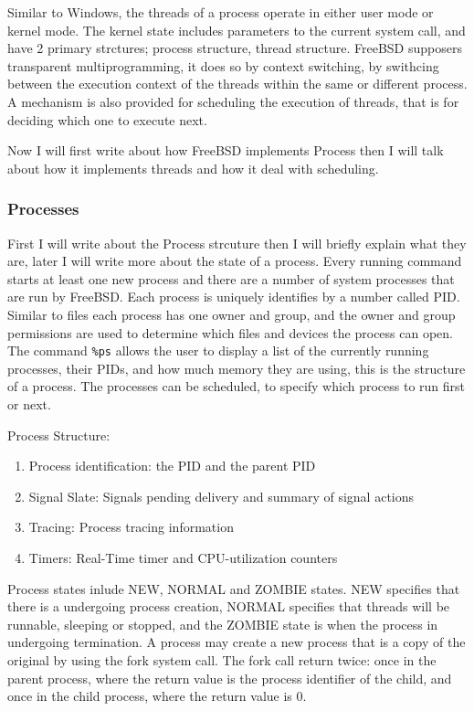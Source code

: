 \documentclass[letterpaper,10pt,draftclsnofoot,onecolumn]{IEEEtran}
\begin{document}
Similar to Windows, the threads of a process operate in either user mode or kernel mode. The kernel state includes parameters to the current system call, and have 2 primary strctures; process structure, thread structure. FreeBSD supposers transparent multiprogramming, it does so by context switching, by swithcing between the execution context of the threads within the same or different process. A mechanism is also provided for scheduling the execution of threads, that is for deciding which one to execute next.

Now I will first write about how FreeBSD implements Process then I will talk about how it implements threads and how it deal with scheduling.

\subsubsection*{Processes}

First I will write about the Process strcuture then I will briefly explain what they are, later I will write more about the state of a process. Every running command starts at least one new process and there are a number of system processes that are run by FreeBSD. Each process is uniquely identifies by a number called PID. Similar to files each process has one owner and group, and the owner and group permissions are used to determine which files and devices the process can open. The command \verb|%ps| allows the user to display a list of the currently running processes, their PIDs, and how much memory they are using, this is the structure of a process. The processes can be scheduled, to specify which process to run first or next.\cite{[2]}

Process Structure:
\begin{enumerate}
\item Process identification: the PID and the parent PID
\item Signal Slate: Signals pending delivery and summary of signal actions
\item Tracing: Process tracing information
\item Timers: Real-Time timer and CPU-utilization counters
\end{enumerate}

Process states inlude NEW, NORMAL and ZOMBIE states. NEW specifies that there is a undergoing process creation, NORMAL specifies that threads will be runnable, sleeping or stopped, and the ZOMBIE state is when the process in undergoing termination. A process may create a new process that is a copy of the original by using the fork system call. The fork call return twice: once in the parent process, where the return value is the process identifier of the child, and once in the child process, where the return value is 0.
\end{document}
